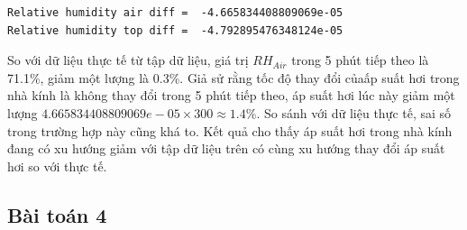 \documentclass[a4paper]{article}
\begin{document}
\begin{verbatim}
Relative humidity air diff =  -4.665834408809069e-05
Relative humidity top diff =  -4.792895476348124e-05
\end{verbatim}

So với dữ liệu thực tế từ tập dữ liệu, giá trị $RH_{Air}$ trong 5 phút tiếp theo là 71.1\%, giảm một lượng là 0.3\%. Giả sử rằng tốc độ thay đổi củaấp suất hơi trong nhà kính là không thay đổi trong 5 phút tiếp theo, áp suất hơi lúc này giảm một lượng $4.665834408809069e-05 \times 300 \approx 1.4\%$. So sánh với dữ liệu thực tế, sai số trong trường hợp này cũng khá to. Kết quả cho thấy áp suất hơi trong nhà kính đang có xu hướng giảm với tập dữ liệu trên có cùng xu hướng thay đổi áp suất hơi so với thực tế.

\subsection{Bài toán 4}
\end{document}
